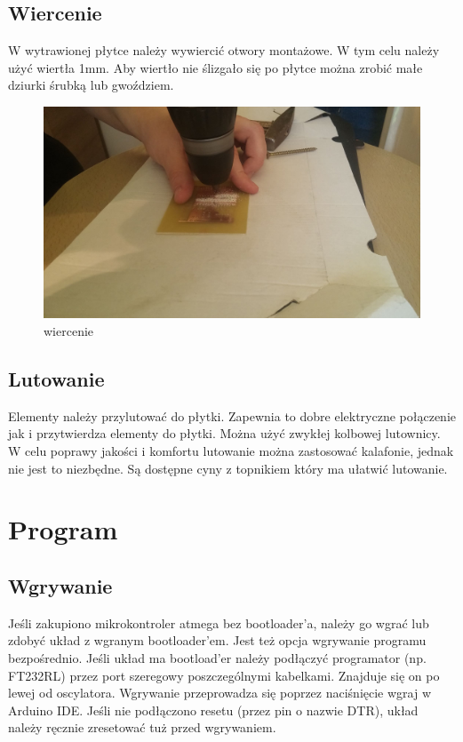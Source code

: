 \documentclass[a4paper,11pt]{article}
\def\SCALE{0.6}
\begin{document}
\subsection{Wiercenie}
W wytrawionej płytce należy wywiercić otwory montażowe. W tym celu należy użyć wiertła 1mm. Aby wiertło nie ślizgało się po płytce można zrobić małe dziurki śrubką lub gwoździem.
\begin{figure}[H]
	\centering
	\includegraphics[width=\SCALE
	\paperwidth]{wiercenie}
	\caption{wiercenie}
\end{figure}	
\subsection{Lutowanie}
Elementy należy przylutować do płytki. Zapewnia to dobre elektryczne połączenie jak i przytwierdza elementy do płytki. Można użyć zwykłej kolbowej lutownicy. W celu poprawy jakości i komfortu lutowanie można zastosować kalafonie, jednak nie jest to niezbędne. Są dostępne cyny z topnikiem który ma ułatwić lutowanie.

\section{Program}
\subsection{Wgrywanie}
Jeśli zakupiono mikrokontroler atmega bez bootloader'a, należy go wgrać lub zdobyć układ z wgranym bootloader'em.
Jest też opcja wgrywanie programu bezpośrednio.
Jeśli układ ma bootload'er należy podłączyć programator (np. FT232RL) przez port szeregowy poszczególnymi kabelkami. Znajduje się on po lewej od oscylatora. Wgrywanie przeprowadza się poprzez naciśnięcie wgraj w Arduino IDE. Jeśli nie podłączono resetu (przez pin o nazwie DTR), układ należy ręcznie zresetować tuż przed wgrywaniem.
\end{document}
